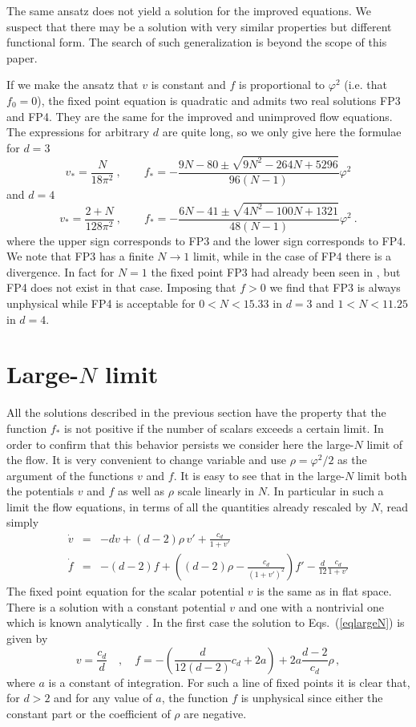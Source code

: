\documentclass[a4paper,11pt]{revtex4}
\newcommand{\be}{\begin{equation}}
\newcommand{\ee}{\end{equation}}
\newcommand{\bea}{\begin{eqnarray}}
\newcommand{\eea}{\end{eqnarray}}
\begin{document}
The same ansatz does not yield a solution for the improved equations.
We suspect that there may be a solution
with very similar properties but different functional form.
The search of such generalization is beyond the scope of this paper.

If we make the ansatz that $v$ is constant and $f$ is proportional
to $\varphi^2$ (i.e. that $f_0=0$), the fixed point equation is quadratic and admits two
real solutions FP3 and FP4.
They are the same for the improved and unimproved flow equations.
The expressions for arbitrary $d$ are quite long, so
we only give here the formulae for $d=3$
\be
v_*=\frac{N}{18\pi^2}\ ,
\qquad
f_*=-\frac{9N-80\pm\sqrt{9N^2-264N+5296}}{96(N-1)}\varphi^2
\ee
and $d=4$
\be
v_*=\frac{2+N}{128\pi^2}\ ,
\qquad
f_*=-\frac{6N-41\pm\sqrt{4N^2-100N+1321}}{48(N-1)}\varphi^2\ .
\ee
where the upper sign corresponds to FP3 
and the lower sign corresponds to FP4.
We note that FP3 has a finite $N\to1$ limit,
while in the case of FP4 there is a divergence.
In fact for $N=1$ the fixed point FP3 had already been seen
in \cite{pv1}, but FP4 does not exist in that case.
Imposing that $f>0$ we find that FP3 is always unphysical
while FP4 is acceptable for $0<N<15.33$ in $d=3$ 
and $1<N<11.25$ in $d=4$.



\section{Large-$N$ limit}

All the solutions described in the previous section
have the property that the function $f_*$ is not
positive if the number of scalars exceeds a certain limit.
In order to confirm that this behavior persists
we consider here the large-$N$ limit of the flow.
It is very convenient to change variable and use $\rho=\varphi^2/2$
as the argument of the functions $v$ and $f$.
It is easy to see that in the large-$N$ limit both the potentials $v$ and $f$ as well as $\rho$ scale linearly in $N$.
In particular in such a limit the flow equations, in terms of all the quantities already rescaled by $N$, read simply
\bea
\dot v &=&-d v + (d-2) \rho  \,v'+\frac{c_d}{1+v'}\nonumber \\
\dot f &=& -(d-2) f+\left((d-2) \rho -\frac{c_d}{\left(1+v'\right)^2}\right) f'  -\frac{ d}{12}\frac{c_d} {1+v'}
\label{eqlargeN}
\eea
The fixed point equation for the scalar potential $v$ is the same as in flat space. There is a solution with a constant potential $v$ and one with a nontrivial one which is known analytically \cite{marchais}. 
In the first case the solution to Eqs.~(\ref{eqlargeN}) is given by
\be
v=\frac{c_d}{d} \quad,\quad  f=-\left(\frac{d}{12(d-2)} c_d+2 a\right) +  2a \frac{d-2}{c_d} \rho \,,
\ee
where $a$ is a constant of integration. For such a line of fixed points it is clear that, for $d>2$  and for any value of $a$, the function $f$ is unphysical since either the constant part or the coefficient of $\rho$ are negative.
\end{document}
